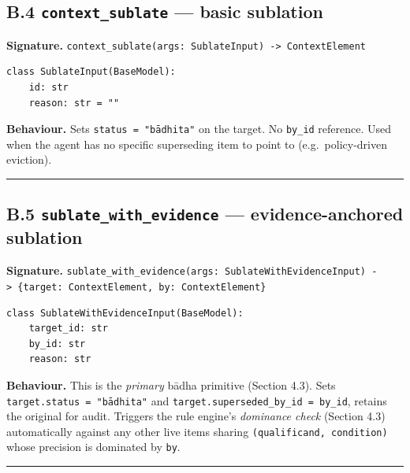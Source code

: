\subsection{\texorpdfstring{B.4 \texttt{context\_sublate} --- basic sublation}{B.4 context\_sublate --- basic sublation}}\label{b.4-context_sublate-basic-sublation}

\textbf{Signature.} \texttt{context\_sublate(args:\ SublateInput)\ -\textgreater{}\ ContextElement}

\begin{verbatim}
class SublateInput(BaseModel):
    id: str
    reason: str = ""
\end{verbatim}

\textbf{Behaviour.} Sets \texttt{status\ =\ "bādhita"} on the target. No \texttt{by\_id} reference. Used when the agent has no specific superseding item to point to (e.g.~policy-driven eviction).

\begin{center}\rule{0.5\linewidth}{0.5pt}\end{center}

\subsection{\texorpdfstring{B.5 \texttt{sublate\_with\_evidence} --- evidence-anchored sublation}{B.5 sublate\_with\_evidence --- evidence-anchored sublation}}\label{b.5-sublate_with_evidence-evidence-anchored-sublation}

\textbf{Signature.} \texttt{sublate\_with\_evidence(args:\ SublateWithEvidenceInput)\ -\textgreater{}\ \{target:\ ContextElement,\ by:\ ContextElement\}}

\begin{verbatim}
class SublateWithEvidenceInput(BaseModel):
    target_id: str
    by_id: str
    reason: str
\end{verbatim}

\textbf{Behaviour.} This is the \emph{primary} bādha primitive (Section 4.3). Sets \texttt{target.status\ =\ "bādhita"} and \texttt{target.superseded\_by\_id\ =\ by\_id}, retains the original for audit. Triggers the rule engine's \emph{dominance check} (Section 4.3) automatically against any other live items sharing \texttt{(qualificand,\ condition)} whose precision is dominated by \texttt{by}.

\begin{center}\rule{0.5\linewidth}{0.5pt}\end{center}


